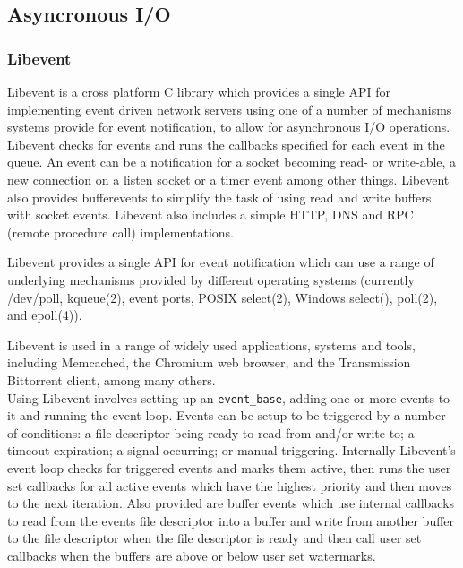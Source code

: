 \documentclass{article}
\begin{document}
\subsection{Asyncronous I/O}

\subsubsection{Libevent}
Libevent\cite{libevent} is a cross platform C library which provides a single API for implementing event driven network servers using one of a number of mechanisms systems provide for event notification, to allow for asynchronous I/O operations. Libevent checks for events and runs the callbacks specified for each event in the queue. An event can be a notification for a socket becoming read- or write-able, a new connection on a listen socket or a timer event among other things. Libevent also provides bufferevents to simplify the task of using read and write buffers with socket events. Libevent also includes a simple HTTP, DNS and RPC (remote procedure call) implementations.

Libevent provides a single API for event notification which can use a range of underlying mechanisms provided by different operating systems (currently /dev/poll, kqueue(2), event ports, POSIX select(2), Windows select(), poll(2), and epoll(4)).

Libevent is used in a range of widely used applications, systems and tools, including Memcached, the Chromium web browser, and the Transmission Bittorrent client, among many others.
\\
Using Libevent involves setting up an \texttt{event\_base}, adding one or more events to it and running the event loop. Events can be setup to be triggered by a number of conditions: a file descriptor being ready to read from and/or write to; a timeout expiration; a signal occurring; or manual triggering. Internally Libevent's event loop checks for triggered events and marks them active, then runs the user set callbacks for all active events which have the highest priority and then moves to the next iteration.
Also provided are buffer events which use internal callbacks to read from the events file descriptor into a buffer and write from another buffer to the file descriptor when the file descriptor is ready and then call user set callbacks when the buffers are above or below user set watermarks.
\\
\\
\end{document}

